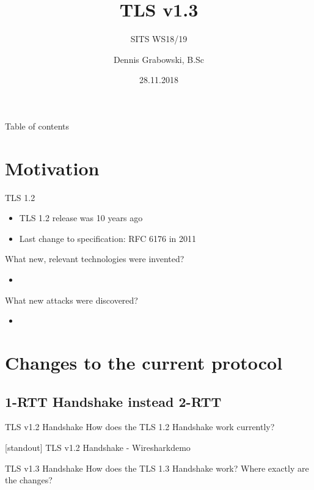 \documentclass{f4_beamer_metropolis}
\title{TLS v1.3}
\subtitle{SITS WS18/19}
\author{Dennis Grabowski, B.Sc}
\date{28.11.2018}
\begin{document}
\begin{frame}{Table of contents}
    \tableofcontents[hideallsubsections]
  \end{frame}

\section{Motivation}

\begin{frame}{TLS 1.2}
\begin{itemize}
  \item TLS 1.2 release was 10 years ago
  \item Last change to specification: RFC 6176 in 2011
\end{itemize}
\end{frame}

\begin{frame}{What new, relevant technologies were invented?}
  \begin{itemize}
    \item
  \end{itemize}
  \end{frame}

\begin{frame}{What new attacks were discovered?}
  \begin{itemize}
    \item
  \end{itemize}
\end{frame}

\section{Changes to the current protocol}

\subsection{1-RTT Handshake instead 2-RTT}

\begin{frame}{TLS v1.2 Handshake}
How does the TLS 1.2 Handshake work currently?
\end{frame}

\begin{frame}{}[standout]
  TLS v1.2 Handshake - Wiresharkdemo
\end{frame}

\begin{frame}{TLS v1.3 Handshake}
  How does the TLS 1.3 Handshake work?
  Where exactly are the changes?
\end{frame}
\end{document}
